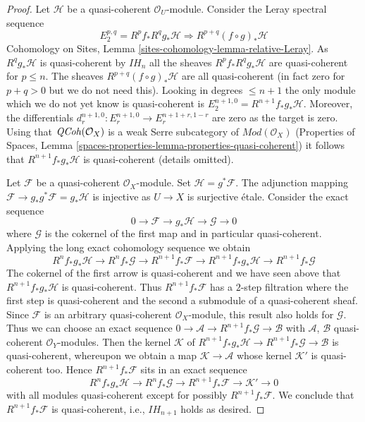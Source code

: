 \begin{proof}
\medskip\noindent
Let $\mathcal{H}$ be a quasi-coherent $\mathcal{O}_U$-module.
Consider the Leray spectral sequence
$$
E_2^{p, q} = R^pf_* R^qg_* \mathcal{H}
\Rightarrow
R^{p + q}(f \circ g)_*\mathcal{H}
$$
Cohomology on Sites, Lemma \ref{sites-cohomology-lemma-relative-Leray}.
As $R^qg_*\mathcal{H}$ is quasi-coherent by $IH_n$ all the sheaves
$R^pf_*R^qg_*\mathcal{H}$ are quasi-coherent for $p \leq n$.
The sheaves $R^{p + q}(f \circ g)_*\mathcal{H}$ are all
quasi-coherent (in fact zero for $p + q > 0$ but we do not need this).
Looking in degrees $\leq n + 1$ the only module which we do not
yet know is quasi-coherent is $E_2^{n + 1, 0} = R^{n + 1}f_*g_*\mathcal{H}$.
Moreover, the differentials
$d_r^{n + 1, 0} : E_r^{n + 1, 0} \to E_r^{n + 1 + r, 1 - r}$
are zero as the target is zero. Using that $\mathit{QCoh}(\mathcal{O}_X)$
is a weak Serre subcategory of $\textit{Mod}(\mathcal{O}_X)$
(Properties of Spaces, Lemma
\ref{spaces-properties-lemma-properties-quasi-coherent}) it
follows that $R^{n + 1}f_*g_*\mathcal{H}$
is quasi-coherent (details omitted).

\medskip\noindent
Let $\mathcal{F}$ be a quasi-coherent $\mathcal{O}_X$-module.
Set $\mathcal{H} = g^*\mathcal{F}$. The adjunction mapping
$\mathcal{F} \to g_*g^*\mathcal{F} = g_*\mathcal{H}$ is injective
as $U \to X$ is surjective \'etale. Consider the exact sequence
$$
0 \to \mathcal{F} \to g_*\mathcal{H} \to \mathcal{G} \to 0
$$
where $\mathcal{G}$ is the cokernel of the first map and in particular
quasi-coherent. Applying the long exact cohomology sequence we obtain
$$
R^nf_*g_*\mathcal{H} \to
R^nf_*\mathcal{G} \to
R^{n + 1}f_*\mathcal{F} \to
R^{n + 1}f_*g_*\mathcal{H} \to
R^{n + 1}f_*\mathcal{G}
$$
The cokernel of the first arrow is quasi-coherent and
we have seen above that $R^{n + 1}f_*g_*\mathcal{H}$ is quasi-coherent.
Thus $R^{n + 1}f_*\mathcal{F}$ has a $2$-step filtration
where the first step is quasi-coherent and the second a submodule of
a quasi-coherent sheaf. Since $\mathcal{F}$ is an arbitrary quasi-coherent
$\mathcal{O}_X$-module, this result also holds for $\mathcal{G}$.
Thus we can choose an exact sequence
$0 \to \mathcal{A} \to R^{n + 1}f_*\mathcal{G} \to \mathcal{B}$
with $\mathcal{A}$, $\mathcal{B}$ quasi-coherent $\mathcal{O}_Y$-modules.
Then the kernel $\mathcal{K}$ of
$R^{n + 1}f_*g_*\mathcal{H} \to R^{n + 1}f_*\mathcal{G}
\to \mathcal{B}$ is quasi-coherent, whereupon we obtain a map
$\mathcal{K} \to \mathcal{A}$ whose kernel $\mathcal{K}'$ is
quasi-coherent too. Hence $R^{n + 1}f_*\mathcal{F}$ sits in an exact
sequence
$$
R^nf_*g_*\mathcal{H} \to
R^nf_*\mathcal{G} \to
R^{n + 1}f_*\mathcal{F} \to \mathcal{K}' \to 0
$$
with all modules quasi-coherent except for possibly $R^{n + 1}f_*\mathcal{F}$.
We conclude that $R^{n + 1}f_*\mathcal{F}$ is quasi-coherent, i.e.,
$IH_{n + 1}$ holds as desired.
\end{proof}

